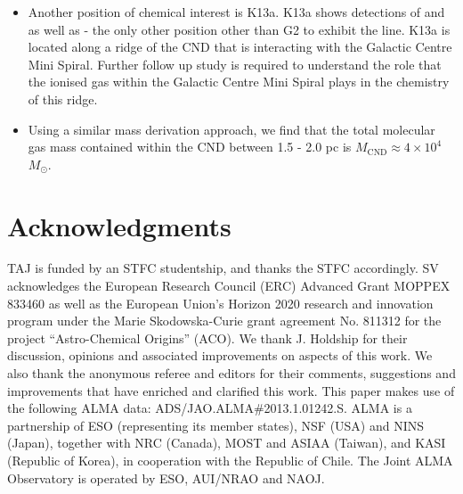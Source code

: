 \documentclass[twocolumn]{aastex631}
\begin{document}
\begin{itemize}
    \item Another position of chemical interest is K13a. K13a shows detections of  and  as well as  - the only other position other than G2 to exhibit the  line. K13a is located along a ridge of the CND that is interacting with the Galactic Centre Mini Spiral. Further follow up study is required to understand the role that the ionised gas within the Galactic Centre Mini Spiral plays in the chemistry of this ridge.
    
    \item Using a similar mass derivation approach, we find that the total molecular gas mass contained within the CND between 1.5 - 2.0 pc is $M_{\mathrm{CND}} \approx 4 \times 10^{4}$ $M_{\odot}$.
    
\end{itemize}


\section*{Acknowledgments}
    TAJ is funded by an STFC studentship, and thanks the STFC accordingly. SV acknowledges the European Research Council (ERC) Advanced Grant MOPPEX 833460 as well as the European Union's Horizon 2020 research and innovation program under the Marie Skodowska-Curie grant agreement No. 811312 for the project ``Astro-Chemical Origins'' (ACO). We thank J. Holdship for their discussion, opinions and associated improvements on aspects of this work. We also thank the anonymous referee and editors for their comments, suggestions and improvements that have enriched and clarified this work. 
    This paper makes use of the following ALMA data: ADS/JAO.ALMA\#2013.1.01242.S. ALMA is a partnership of ESO (representing its member states), NSF (USA) and NINS (Japan), together with NRC (Canada), MOST and ASIAA (Taiwan), and KASI (Republic of Korea), in cooperation with the Republic of Chile. The Joint ALMA Observatory is operated by ESO, AUI/NRAO and NAOJ.



\end{document}
